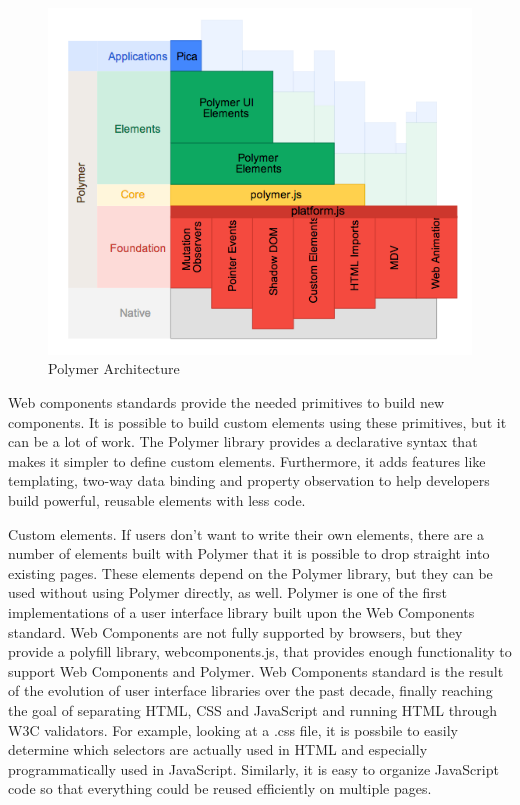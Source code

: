 \begin{figure}[htb]
 \centering
 \includegraphics[width=1.0\linewidth]{images/chapter3/polymer-architecture.png}\hfill
 \caption[Polymer Architecture]{Polymer Architecture}
 \label{fig:fourV}
\end{figure}
Web components standards provide the needed primitives to build new components. It is possible to build custom elements using these primitives, but it can be a lot of work.
The Polymer library provides a declarative syntax that makes it simpler to define custom elements. Furthermore, it adds features like templating, two-way data binding and property observation to help developers build powerful, reusable elements with less code.

Custom elements. If users don’t want to write their own elements, there are a number of elements built with Polymer that it is possible to drop straight into existing pages. These elements depend on the Polymer library, but they can be used without using Polymer directly, as well.\cite{tch_polymer1}
\newline
Polymer is one of the first implementations of a user interface library  built upon the Web Components standard. Web Components are not fully supported by browsers, but they provide a polyfill library, webcomponents.js, that provides enough functionality to support Web Components and Polymer.
\newline
Web Components standard is the result of the evolution of user interface libraries over the past decade, finally reaching the goal of separating HTML, CSS and JavaScript and running HTML through W3C validators. For example, looking at a .css file, it is possbile to easily determine which selectors are actually used in HTML and especially programmatically used in JavaScript. Similarly, it is easy to organize JavaScript code so that everything could be reused efficiently on multiple pages.\cite{tch_polymer2}
